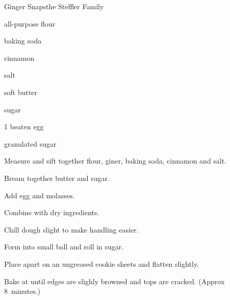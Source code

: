 \begin{recipe}{Ginger Snaps}{the Steffler Family}{}

\begin{ingredients}
\item {} all-purpose flour
\item {} 
\item {} baking soda
\item {} cinnamon
\item \tp{\quarter} salt
\item \C{\threequarter} soft butter
\item {} sugar
\item 1 beaten egg
\item \C{\half} 
\item granulated sugar
\end{ingredients}

\begin{directions}
\item Measure and sift together flour, giner, baking soda, cinnamon and salt.
\item Bream together butter and sugar.
\item Add egg and molasses.
\item Combine with dry ingredients.
\item Chill dough slight to make handling easier.
\item Form into small ball and roll in sugar.
\item Place  apart on an ungreased cookie sheets and flatten slightly.
\item Bake at  until edges are slighly browned and tops are cracked. (Approx 8~minutes.)
\end{directions}
\end{recipe}
